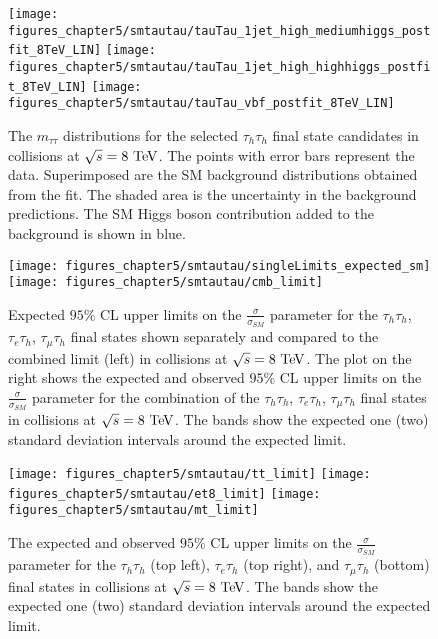 \begin{figure}[htbp]
\centering
\texttt{[image: figures\_chapter5/smtautau/tauTau\_1jet\_high\_mediumhiggs\_postfit\_8TeV\_LIN]}
\texttt{[image: figures\_chapter5/smtautau/tauTau\_1jet\_high\_highhiggs\_postfit\_8TeV\_LIN]}
\texttt{[image: figures\_chapter5/smtautau/tauTau\_vbf\_postfit\_8TeV\_LIN]}
\caption{The $m_{\tau\tau}$ distributions for the selected $\tau_{h}\tau_{h}$ final state candidates in collisions at $\sqrt{s}=8~\mathrm{Te\kern -0.1em V}$. The points with error bars represent the data. Superimposed are the SM background distributions obtained from the fit. The shaded area is the uncertainty in the background predictions. The SM Higgs boson contribution added to the background is shown in blue.}
\label{fig:tautau}
\end{figure}

\begin{figure}[htbp]
\centering
\texttt{[image: figures\_chapter5/smtautau/singleLimits\_expected\_sm]}
\texttt{[image: figures\_chapter5/smtautau/cmb\_limit]}
\caption{Expected $95\%$ CL upper limits on the $\frac{\sigma}{\sigma_{SM}}$ parameter for the $\tau_{h}\tau_{h}$, $\tau_{e}\tau_{h}$, $\tau_{\mu}\tau_{h}$ final states shown separately and compared to the combined limit (left) in collisions at $\sqrt{s}=8~\mathrm{Te\kern -0.1em V}$. The plot on the right shows the expected and observed $95\%$ CL upper limits on the $\frac{\sigma}{\sigma_{SM}}$ parameter for the combination of the $\tau_{h}\tau_{h}$, $\tau_{e}\tau_{h}$, $\tau_{\mu}\tau_{h}$ final states in collisions at $\sqrt{s}=8~\mathrm{Te\kern -0.1em V}$. The bands show the expected one (two) standard deviation intervals around the expected limit.}
\label{fig:cmblim}
\end{figure}


\begin{figure}[htbp]
\centering
\texttt{[image: figures\_chapter5/smtautau/tt\_limit]}
\texttt{[image: figures\_chapter5/smtautau/et8\_limit]}
\texttt{[image: figures\_chapter5/smtautau/mt\_limit]}
\caption{The expected and observed $95\%$ CL upper limits on the $\frac{\sigma}{\sigma_{SM}}$ parameter for the $\tau_{h}\tau_{h}$ (top left), $\tau_{e}\tau_{h}$ (top right), and $\tau_{\mu}\tau_{h}$ (bottom) final states in collisions at $\sqrt{s}=8~\mathrm{Te\kern -0.1em V}$. The bands show the expected one (two) standard deviation intervals around the expected limit.}
\label{fig:ind}
\end{figure}

